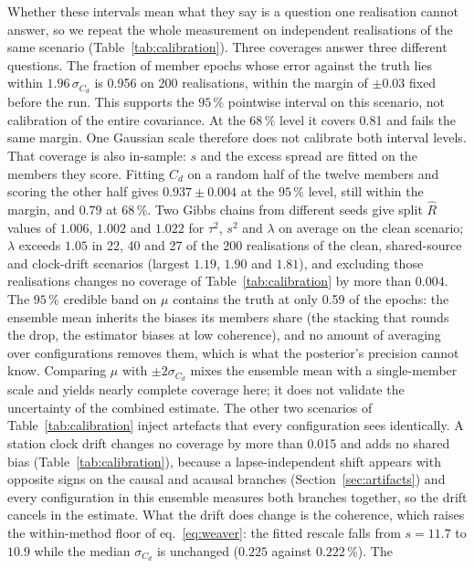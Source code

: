 \documentclass[
  referee]{gji}
\begin{document}
Whether these intervals mean what they say is a question one realisation
cannot answer, so we repeat the whole measurement on independent
realisations of the same scenario (Table~\ref{tab:calibration}). Three
coverages answer three different questions. The fraction of member
epochs whose error against the truth lies within \(1.96\,\sigma_{C_d}\)
is 0.956 on 200 realisations, within the margin of \(\pm 0.03\) fixed
before the run. This supports the \(95\,\%\) pointwise interval on this
scenario, not calibration of the entire covariance. At the \(68\,\%\)
level it covers 0.81 and fails the same margin. One Gaussian scale
therefore does not calibrate both interval levels. That coverage is also
in-sample: \(s\) and the excess spread are fitted on the members they
score. Fitting \(C_d\) on a random half of the twelve members and
scoring the other half gives \(0.937\pm0.004\) at the \(95\,\%\) level,
still within the margin, and \(0.79\) at \(68\,\%\). Two Gibbs chains
from different seeds give split \(\hat R\) values of \(1.006\),
\(1.002\) and \(1.022\) for \(\tau^2\), \(s^2\) and \(\lambda\) on
average on the clean scenario; \(\lambda\) exceeds \(1.05\) in 22, 40
and 27 of the 200 realisations of the clean, shared-source and
clock-drift scenarios (largest \(1.19\), \(1.90\) and \(1.81\)), and
excluding those realisations changes no coverage of
Table~\ref{tab:calibration} by more than \(0.004\). The \(95\,\%\)
credible band on \(\mu\) contains the truth at only 0.59 of the epochs:
the ensemble mean inherits the biases its members share (the stacking
that rounds the drop, the estimator biases at low coherence), and no
amount of averaging over configurations removes them, which is what the
posterior's precision cannot know. Comparing \(\mu\) with
\(\pm 2\sigma_{C_d}\) mixes the ensemble mean with a single-member scale
and yields nearly complete coverage here; it does not validate the
uncertainty of the combined estimate. The other two scenarios of
Table~\ref{tab:calibration} inject artefacts that every configuration
sees identically. A station clock drift changes no coverage by more than
0.015 and adds no shared bias (Table~\ref{tab:calibration}), because a
lapse-independent shift appears with opposite signs on the causal and
acausal branches (Section~\ref{sec:artifacts}) and every configuration
in this ensemble measures both branches together, so the drift cancels
in the estimate. What the drift does change is the coherence, which
raises the within-method floor of eq.~\ref{eq:weaver}: the fitted
rescale falls from \(s=11.7\) to \(10.9\) while the median
\(\sigma_{C_d}\) is unchanged (\(0.225\) against \(0.222\,\%\)). The
\end{document}
